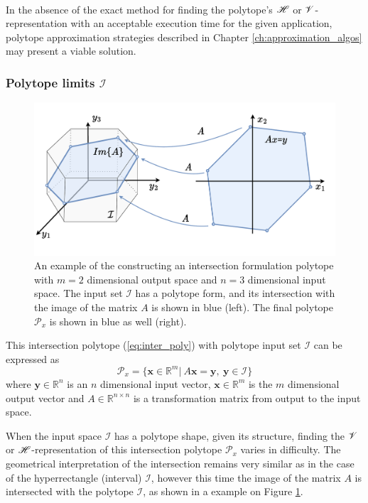 \paragraph*{}In the absence of the exact method for finding the polytope's $\mathscr{H}$ or $\mathscr{V}$-representation with an acceptable execution time for the given application, polytope approximation strategies described in Chapter \ref{ch:approximation_algos} may present a viable solution. 

\subsubsection{Polytope limits $\mathcal{I}$}
\label{ch:inter_poly_chapter}
\begin{figure}[h]
    \centering
    \includegraphics[width=0.7\linewidth]{Chapters/imgs/inter_poly.pdf}
    \caption{An example of the constructing an intersection formulation polytope with $m=2$ dimensional output space and $n=3$ dimensional input space. The input set $\mathcal{I}$ has a polytope form, and its intersection with the image of the matrix $A$ is shown in blue (left). The final polytope $\mathcal{P}_x$ is shown in blue as well (right).}
    \label{fig:inter_poly}
\end{figure}



This intersection polytope (\ref{eq:inter_poly}) with polytope input set $\mathcal{I}$ can be expressed as
\begin{equation}
    \mathcal{P}_x=\{\bm{x}\in\mathbb{R}^m |~ A\bm{x} = \bm{y},~\bm{y} \in \mathcal{I}  \}
\end{equation}
where $\bm{y}\in\mathbb{R}^n$ is an $n$ dimensional input vector, $\bm{x}\in\mathbb{R}^m$ is the $m$ dimensional output vector and $A\in\mathbb{R}^{n\times n}$ is a transformation matrix from output to the input space.

When the input space $\mathcal{I}$ has a polytope shape, given its structure, finding the $\mathscr{V}$ or $\mathscr{H}$-representation of this intersection polytope $\mathcal{P}_x$ varies in difficulty. 
The geometrical interpretation of the intersection remains very similar as in the case of the hyperrectangle (interval) $\mathcal{I}$, however this time the image of the matrix $A$ is intersected with the polytope $\mathcal{I}$, as shown in a example on Figure \ref{fig:inter_poly}.

